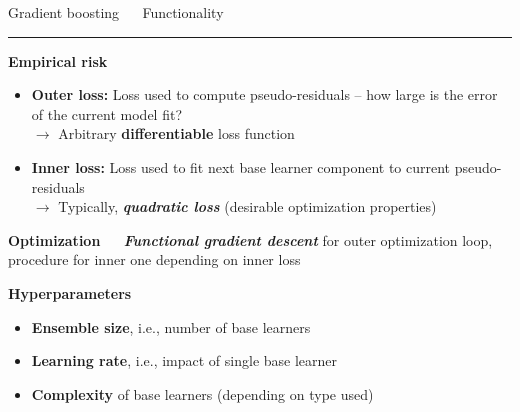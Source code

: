 \documentclass[11pt,compress,t,notes=noshow, xcolor=table]{beamer}
\begin{document}

\LARGE
\begin{frame}{\textcolor{gray!80}{Gradient boosting} ~~ Functionality}
\normalsize
\vspace{-0.5cm}
\noindent \textcolor{gray!80}{\rule{\textwidth}{1pt}}

\vspace{0.3cm}

\footnotesize

\textbf{\textcolor{gray!80}{Empirical risk}}

\begin{itemize}
  \item \textbf{Outer loss:} Loss used to compute pseudo-residuals -- how large 
  is the error of the current model fit? \\
  $\rightarrow$ Arbitrary \textbf{differentiable} loss function
  \item \textbf{Inner loss:} Loss used to fit next base learner component to 
  current pseudo-residuals \\
  $\rightarrow$ Typically, \textit{\textbf{quadratic loss}} (desirable 
  optimization properties)
\end{itemize}

\medskip

\textbf{\textcolor{gray!80}{Optimization}} ~~ \textit{\textbf{Functional 
gradient descent}} for outer optimization loop, procedure for inner one 
depending on inner loss

\medskip

\textbf{\textcolor{gray!80}{Hyperparameters}}

\begin{itemize}
  \item \textbf{Ensemble size}, i.e., number of base learners
  \item \textbf{Learning rate}, i.e., impact of single base learner
  \item \textbf{Complexity} of base learners (depending on type used)
\end{itemize}

\end{frame}

\end{document}
